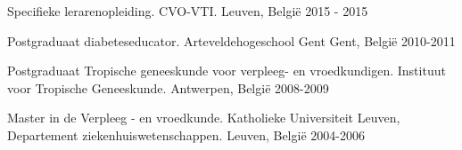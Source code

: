


\begin{cventries}



\cventry
{Specifieke lerarenopleiding.} %
{CVO-VTI.} %
{Leuven, België} %
{2015 - 2015} %
{ %
}

\cventry
{Postgraduaat diabeteseducator.} %
{Arteveldehogeschool Gent} %
{Gent, België} %
{2010-2011} %
{ %
}

\cventry
{Postgraduaat Tropische geneeskunde voor verpleeg- en vroedkundigen.} %
{Instituut voor Tropische Geneeskunde.} %
{Antwerpen, België} %
{2008-2009} %
{ %
}



\cventry
{Master in de Verpleeg - en vroedkunde.} %
{Katholieke Universiteit Leuven, Departement ziekenhuiswetenschappen.} %
{Leuven, België} %
{2004-2006} %
{ %
}


\end{cventries}
